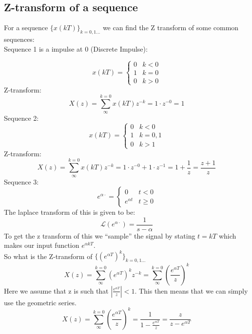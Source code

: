 \documentclass[a4paper,11pt]{article}
\begin{document}
	\subsection{Z-transform of a sequence}
	For a sequence $\{x(kT)\}_{k=0,1...}$ we can find the Z transform of some common sequences:\\
	Sequence 1 is a impulse at 0 (Discrete Impulse):
	
		\[ x(kT) =\begin{cases} 
      			0 & k < 0\\
      			1 & k = 0\\
			0 & k > 0   			
   			\end{cases}
			\]
		Z-transform:
		\begin{equation}
		    X(z)= \sum\limits_{\infty}^{k=0}x(kT)z^{-k}=1\cdot z^{-0} = 1
		\end{equation}
	Sequence 2:
			\[ x(kT) =\begin{cases} 
      			0 & k < 0\\
      			1 & k = 0,1\\
			0 & k > 1   			
   			\end{cases}
			\]
		Z-transform:
		\begin{equation}
		    X(z)= \sum\limits_{\infty}^{k=0}x(kT)z^{-k}=1\cdot z^{-0} +1\cdot z^{-1}= 1+\frac{1}{z} = \frac{z+1}{z}
		\end{equation}
	Sequence 3:
			\[ e^{\alpha \cdot}  =\begin{cases} 
      			0 & t < 0\\
      			e^{\alpha t} & t \geq 0			
   			\end{cases}
			\]
		The laplace transform of this is given to be:
		\begin{equation}
		   \mathcal{L}(e^{\alpha \cdot})= \frac{1}{s-\alpha}
		\end{equation}
		To get the z transform of this we ``sample'' the signal  by stating $t=kT$ which makes our input function $e^{\alpha kT}$.\\
		So what is the Z-transform of $\{(e^{\alpha T})^{k}\}_{k=0,1...}$
		\begin{equation}
		    X(z)= \sum\limits_{\infty}^{k=0}(e^{\alpha T})^{k}z^{-k}=\sum\limits_{\infty}^{k=0}(\frac{e^{\alpha T}}{z})^{k}
		\end{equation}
		Here we assume that z is such that $|\frac{e^{\alpha T}}{z}|<1$. This then means that we can simply use the geometric series.
		\begin{equation}
		    X(z)= \sum\limits_{\infty}^{k=0}(\frac{e^{\alpha T}}{z})^{k}=\frac{1}{1-\frac{e^{\alpha T}}{z}}=\frac{z}{z-e^{\alpha T}}
		\end{equation}
\end{document}
